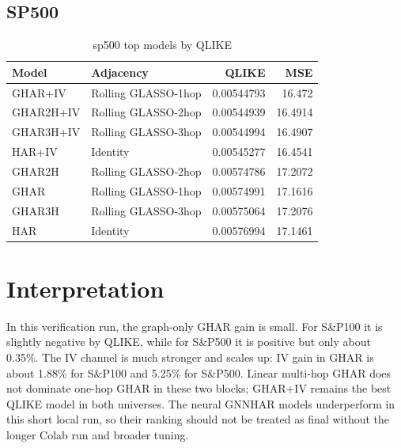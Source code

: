 \documentclass[11pt]{article}
\begin{document}
\subsection{SP500}
\begin{table}[h]
\centering
\small
\caption{sp500 top models by QLIKE}
\begin{tabular}{llrr}
\toprule
Model & Adjacency & QLIKE & MSE \\
\midrule
GHAR+IV & Rolling GLASSO-1hop & 0.00544793 & 16.472 \\
GHAR2H+IV & Rolling GLASSO-2hop & 0.00544939 & 16.4914 \\
GHAR3H+IV & Rolling GLASSO-3hop & 0.00544994 & 16.4907 \\
HAR+IV & Identity & 0.00545277 & 16.4541 \\
GHAR2H & Rolling GLASSO-2hop & 0.00574786 & 17.2072 \\
GHAR & Rolling GLASSO-1hop & 0.00574991 & 17.1616 \\
GHAR3H & Rolling GLASSO-3hop & 0.00575064 & 17.2076 \\
HAR & Identity & 0.00576994 & 17.1461 \\
\bottomrule
\end{tabular}
\end{table}
\section{Interpretation}
In this verification run, the graph-only GHAR gain is small. For S\&P100 it is slightly negative by QLIKE, while for S\&P500 it is positive but only about 0.35\%. The IV channel is much stronger and scales up: IV gain in GHAR is about 1.88\% for S\&P100 and 5.25\% for S\&P500. Linear multi-hop GHAR does not dominate one-hop GHAR in these two blocks; GHAR+IV remains the best QLIKE model in both universes. The neural GNNHAR models underperform in this short local run, so their ranking should not be treated as final without the longer Colab run and broader tuning.
\end{document}

